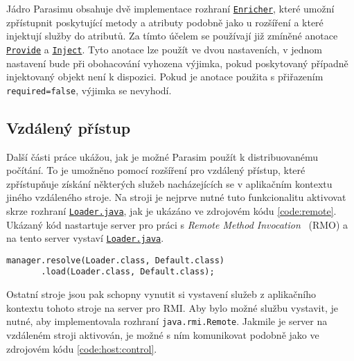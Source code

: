 Jádro Parasimu obsahuje dvě implementace rozhraní \href{https://github.com/sybila/parasim/blob/2.0.0.Final/core/src/main/java/org/sybila/parasim/core/spi/enrichment/Enricher.java}{\texttt{Enricher}},
které umožní zpřístupnit poskytující metody a atributy podobně jako u rozšíření 
a které injektují služby do atributů. Za tímto účelem se používají již zmíněné anotace \href{https://github.com/sybila/parasim/blob/2.0.0.Final/core/src/main/java/org/sybila/parasim/core/annotation/Provide.java}{\texttt{Provide}} a \href{https://github.com/sybila/parasim/blob/2.0.0.Final/core/src/main/java/org/sybila/parasim/core/annotation/Inject.java}{\texttt{Inject}}.
Tyto anotace lze použít ve dvou nastaveních, v jednom nastavení bude při obohacování
vyhozena výjimka, pokud poskytovaný případně injektovaný objekt není k dispozici.
Pokud je anotace použita s přiřazením \texttt{required=false}, výjimka se nevyhodí.

\subsection{Vzdálený přístup}\label{section:remote}

Další části práce ukážou, jak je možné Parasim použít k distribuovanému počítání.
To je umožněno pomocí rozšíření pro vzdálený přístup, které zpří\-stup\-ňu\-je získání
některých služeb nacházejících se v aplikačním kontextu jiného vzdá\-le\-né\-ho stroje.
Na stroji je nejprve nutné tuto funkcionalitu aktivovat skrze rozhraní \href{https://github.com/sybila/parasim/blob/2.0.0.Final/core/src/main/java/org/sybila/parasim/core/api/remote/Loader.java}{\texttt{Loader.java}},
jak je ukázáno ve zdrojovém kódu \ref{code:remote}. Ukázaný kód nastartuje server
pro práci s \textit{Remote Method Invocation}~\cite{grosso2001} (RMO) a na tento server vystaví \href{https://github.com/sybila/parasim/blob/2.0.0.Final/core/src/main/java/org/sybila/parasim/core/api/remote/Loader.java}{\texttt{Loader.java}}.

\begin{lstlisting}[label={code:remote}, caption={Spuštění serveru}, style=Java]
manager.resolve(Loader.class, Default.class)
	   .load(Loader.class, Default.class);
\end{lstlisting}
Ostatní stroje jsou pak schopny vynutit si vystavení služeb z aplikač\-ní\-ho kontextu
tohoto stroje na server pro RMI. Aby bylo možné službu vystavit, je nutné, aby implementovala
rozhraní \texttt{java.rmi.Remote}. Jakmile je server na vzdáleném stroji aktivován,
je možné s ním komunikovat podobně jako ve zdrojovém kódu \ref{code:host:control}.

